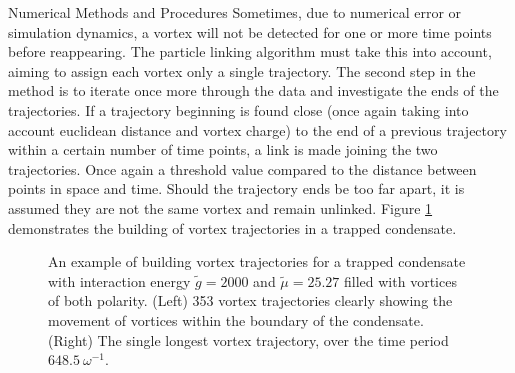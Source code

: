 \begin{chapter}{\label{cha:numerics}Numerical Methods and Procedures}
Sometimes, due to numerical error or simulation dynamics, a vortex will not be detected for one or more time points before reappearing. The particle linking algorithm must take this into account, aiming to assign each vortex only a single trajectory. The second step in the method is to iterate once more through the data and investigate the ends of the trajectories. If a trajectory beginning is found close (once again taking into account euclidean distance and vortex charge) to the end of a previous trajectory within a certain number of time points, a link is made joining the two trajectories. Once again a threshold value compared to the distance between points in space and time. Should the trajectory ends be too far apart, it is assumed they are not the same vortex and remain unlinked. Figure \ref{fig:vortextracks} demonstrates the building of vortex trajectories in a trapped condensate.
\begin{figure}[!ht]
\begin{center}
  \end{center}
  \caption{An example of building vortex trajectories for a trapped condensate with interaction energy $\tilde{g}=2000$ and $\tilde{\mu}=25.27$ filled with vortices of both polarity. (Left) 353 vortex trajectories clearly showing the movement of vortices within the boundary of the condensate. (Right) The single longest vortex trajectory, over the time period $648.5~\omega^{-1}$.\label{fig:vortextracks}}
\end{figure}



\end{chapter}
